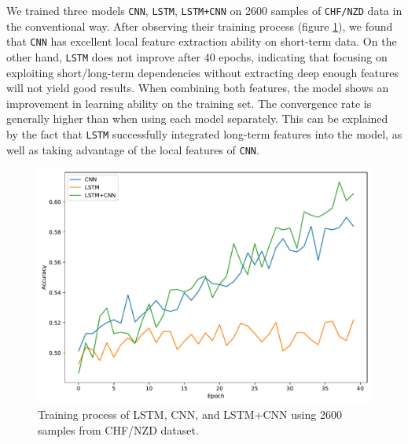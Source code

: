 \documentclass[aps,prb,groupedaddress,twocolumn,showpacs,dvipdfmx,superscriptaddress,pdftex]{revtex4-2}
\begin{document}
We trained three models \verb|CNN|, \verb|LSTM|, \verb|LSTM+CNN| on 2600 samples of \verb|CHF/NZD| data in the conventional way. After observing their training process (figure \ref{fig:lstm_cnn}), we found that \verb|CNN| has excellent local feature extraction ability on short-term data. On the other hand, \verb|LSTM| does not improve after 40 epochs, indicating that focusing on exploiting short/long-term dependencies without extracting deep enough features will not yield good results. When combining both features, the model shows an improvement in learning ability on the training set. The convergence rate is generally higher than when using each model separately. This can be explained by the fact that \verb|LSTM| successfully integrated long-term features into the model, as well as taking advantage of the local features of \verb|CNN|.

\begin{figure}
    \centering
    \includegraphics[width=\linewidth]{img/models.pdf}
    \caption{Training process of LSTM, CNN, and LSTM+CNN using 2600 samples from CHF/NZD dataset.}
    \label{fig:lstm_cnn}
\end{figure}

\vspace{2mm}

\end{document}
